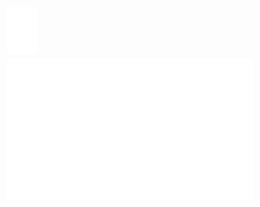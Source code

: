 \documentclass[10pt]{article}
\begin{document}
\includegraphics[max width=\textwidth, center]{2025_04_17_46e04c6acd873ea9558dg-142(3)}\\
\includegraphics[max width=\textwidth, center]{2025_04_17_46e04c6acd873ea9558dg-142(5)}\\
\end{document}
